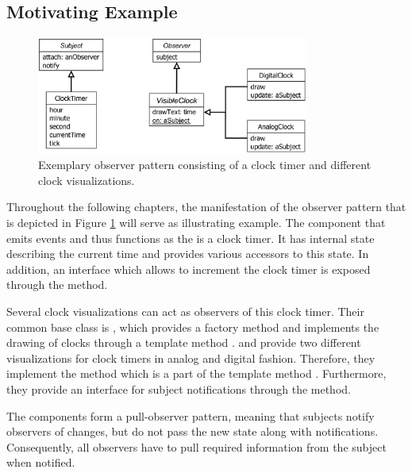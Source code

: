 \subsection{Motivating Example}
\label{ss:BackgroundModelingExample}

\begin{figure}[tb]
	\centering
	\includegraphics[width=0.8\textwidth]{../images/02-ObserverExample}
	\caption[Exemplary Observer Pattern]{Exemplary observer pattern consisting of a clock timer and different clock visualizations.}
	\label{fig:BackgroundExample}
\end{figure}

Throughout the following chapters, the manifestation of the observer pattern \cite{gamma_design_1995} that is depicted in Figure \ref{fig:BackgroundExample} will serve as illustrating example.
The component that emits events and thus functions as the  is a clock timer.
It has internal state describing the current time and provides various accessors to this state.
In addition, an interface which allows to increment the clock timer is exposed through the  method.

Several clock visualizations can act as observers of this clock timer.
Their common base class is , which provides a factory method \cite{gamma_design_1995} and implements the drawing of clocks through a template method \cite{gamma_design_1995}.
 and  provide two different visualizations for clock timers in analog and digital fashion.
Therefore, they implement the  method which is a part of the template method .
Furthermore, they provide an interface for subject notifications through the  method.

The components form a pull-observer pattern, meaning that subjects notify observers of changes, but do not pass the new state along with notifications.
Consequently, all observers have to pull required information from the subject when notified.

